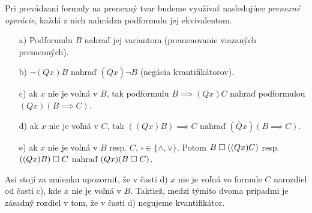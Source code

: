 Pri prevádzaní formuly na prenexný tvar budeme využívať nasledujúce
{\it prenexné operácie}, každá z nich nahrádza podformulu
jej ekvivalentom.
\begin{itemize}
    \item[a)] Podformulu $B$ nahraď jej variantom (premenovanie viazaných
        premenných).

    \item[b)] $\neg(Q x) B$ nahraď $(\overline{Q} x) \neg B$
        (negácia kvantifikátorov).

    \item[c)] ak $x$ nie je voľná v $B$, tak podformulu $B\implies (Qx)C$
            nahraď podformulou $(Qx) (B\implies C)$.

    \item[d)] ak $x$ nie je voľná v $C$, tak $((Qx) B) \implies C$
        nahraď $(\overline{Q} x) (B \implies C)$.

    \item[e)] ak $x$ nie je voľná v $B$ resp. $C$, $\square \in \{\land,\lor\}$.
     Potom $B \;\square\; ((Qx)C)$ resp. $((Qx)B)\;\square\; C$ nahraď
     $(Qx)(B \;\square\; C)$.
\end{itemize}
\begin{poznamka}
    Asi stojí za zmienku upozorniť, že v časti d) $x$ nie je voľná vo
    formule $C$ narozdiel od časti c), kde $x$ nie je voľná v $B$.
    Taktiež, medzi týmito dvoma prípadmi je zásadný rozdiel v
    tom, že v časti d) negujeme kvantifikátor.
\end{poznamka}

